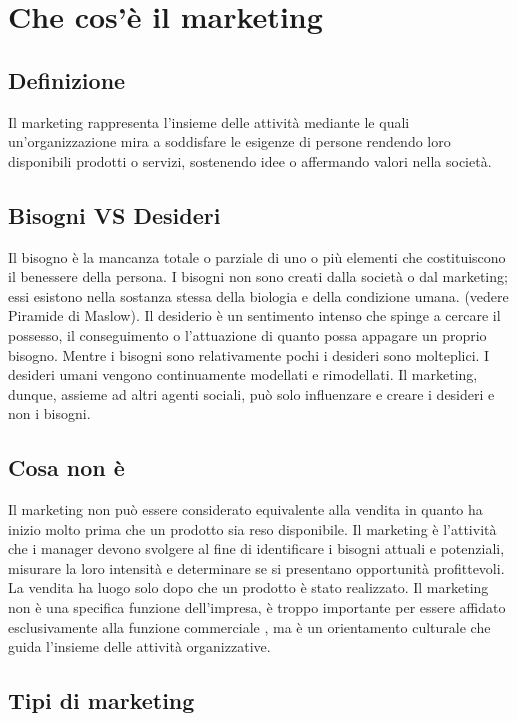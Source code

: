 \section{Che cos'è il marketing}
\subsection{Definizione}
Il marketing rappresenta l’insieme delle attività mediante le quali un’organizzazione mira a soddisfare le esigenze di persone rendendo loro disponibili prodotti o servizi, sostenendo idee o affermando valori nella società.

\subsection{Bisogni VS Desideri}
Il bisogno è la mancanza totale o parziale di uno o più elementi che costituiscono il benessere della persona. I bisogni non sono creati dalla società o dal marketing; essi esistono nella sostanza stessa della biologia e della condizione umana. (vedere Piramide di Maslow).
Il desiderio è un sentimento intenso che spinge a cercare il possesso, il conseguimento o l’attuazione di quanto possa appagare un proprio bisogno. \newline
Mentre i bisogni sono relativamente pochi i desideri sono molteplici. I desideri umani vengono continuamente modellati e rimodellati. \newline
Il marketing, dunque, assieme ad altri agenti sociali, può solo influenzare e creare i desideri e non i bisogni.

\subsection{Cosa non è}
Il marketing non può essere considerato equivalente alla vendita in quanto ha inizio molto prima che un prodotto sia reso disponibile. Il marketing è l’attività che i manager devono svolgere al fine di identificare i bisogni attuali e potenziali, misurare la loro intensità e determinare se si presentano opportunità profittevoli. La vendita ha luogo solo dopo che un prodotto è stato realizzato. \newline
Il marketing non è una specifica funzione dell’impresa, è troppo importante per essere affidato esclusivamente alla funzione commerciale , ma è un orientamento culturale che guida l’insieme delle attività organizzative.

\subsection{Tipi di marketing}
